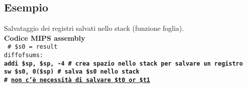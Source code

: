 \documentclass[../main.tex]{subfiles}
\begin{document}
\subsection*{Esempio}
Salvataggio dei registri salvati nello stack (funzione foglia).
\\[5mm]
\textbf{Codice MIPS assembly} \\
\texttt{
    \# \$s0 = result \\
    diffofsums: \\
    \textbf{
        \hspace*{0cm} \hspace*{0cm} \hspace*{0cm} \hspace*{0cm} addi \$sp, \$sp, -4 \hspace*{0cm} \# crea spazio nello stack per salvare un registro \\
        \hspace*{0cm} \hspace*{0cm} \hspace*{0cm} \hspace*{0cm} sw \$s0, 0(\$sp) \hspace*{0cm} \hspace*{0cm} \hspace*{0cm} \hspace*{0cm} \# salva \$s0 nello stack \\
        \hspace*{0cm} \hspace*{0cm} \hspace*{0cm} \hspace*{0cm} \hspace*{0cm} \hspace*{0cm} \hspace*{0cm} \hspace*{0cm} \hspace*{0cm} \hspace*{0cm} \hspace*{0cm} \hspace*{0cm} \hspace*{0cm} \hspace*{0cm} \hspace*{0cm} \hspace*{0cm} \hspace*{0cm} \hspace*{0cm} \hspace*{0cm} \hspace*{0cm} \hspace*{0cm} \hspace*{0cm} \hspace*{0cm} \# \underline{non c'è necessità di salvare \$t0 or \$t1} \\
}}
\end{document}
